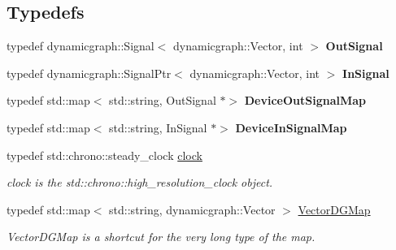 \subsection*{Typedefs}
\begin{DoxyCompactItemize}
\item 
\mbox{\label{namespacedynamic__graph_a6c34573645d04590fd934e56f3d1b16b}} 
typedef dynamicgraph\+::\+Signal$<$ dynamicgraph\+::\+Vector, int $>$ {\bfseries Out\+Signal}
\item 
\mbox{\label{namespacedynamic__graph_a5a0e93b7f753ed4c9869e83a04c30d74}} 
typedef dynamicgraph\+::\+Signal\+Ptr$<$ dynamicgraph\+::\+Vector, int $>$ {\bfseries In\+Signal}
\item 
\mbox{\label{namespacedynamic__graph_a4769898c82f6e8bef38422819cca0481}} 
typedef std\+::map$<$ std\+::string, Out\+Signal $\ast$$>$ {\bfseries Device\+Out\+Signal\+Map}
\item 
\mbox{\label{namespacedynamic__graph_a7deb814159c6992434f2660870726c73}} 
typedef std\+::map$<$ std\+::string, In\+Signal $\ast$$>$ {\bfseries Device\+In\+Signal\+Map}
\item 
typedef std\+::chrono\+::steady\+\_\+clock \hyperlink{namespacedynamic__graph_aca70acb5331a18e090e49b3d85290a7e}{clock}
\begin{DoxyCompactList}\small\item\em clock is the std\+::chrono\+::high\+\_\+resolution\+\_\+clock object. \end{DoxyCompactList}\item 
\mbox{\label{namespacedynamic__graph_a51212ed7fa4ae81e7b362a27f09b7ab8}} 
typedef std\+::map$<$ std\+::string, dynamicgraph\+::\+Vector $>$ \hyperlink{namespacedynamic__graph_a51212ed7fa4ae81e7b362a27f09b7ab8}{Vector\+D\+G\+Map}
\begin{DoxyCompactList}\small\item\em Vector\+D\+G\+Map is a shortcut for the very long type of the map. \end{DoxyCompactList}\item 
\mbox{\label{namespacedynamic__graph_a51b66113dc1d4eee03abd7779479cc69}} 

\end{DoxyCompactItemize}
